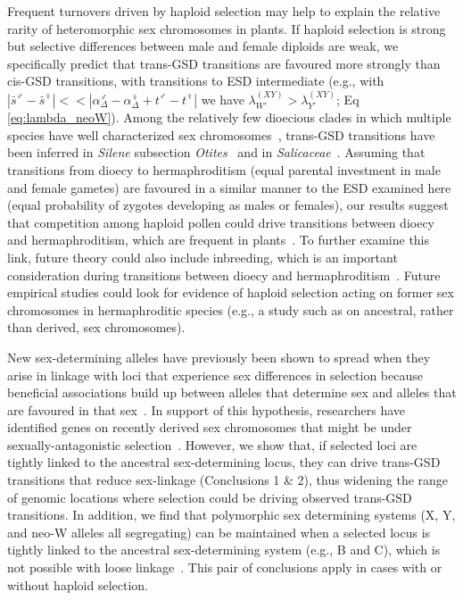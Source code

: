 \documentclass[10pt,letterpaper]{article}
\begin{document}
Frequent turnovers driven by haploid selection may help to explain the relative rarity of heteromorphic sex chromosomes in plants.
If haploid selection is strong but selective differences between male and female diploids are weak, we specifically predict that trans-GSD transitions are favoured more strongly than cis-GSD transitions, with transitions to ESD intermediate (e.g., with $|\bar{s}^\male - \bar{s}^\female| << |\alpha_\Delta^\male - \alpha_\Delta^\female + t^\male - t^\female|$ we have $\lambda_{W'}^{(XY)} > \lambda_{Y'}^{(XY)}$; Eq \ref{eq:lambda_neoW}). 
Among the relatively few dioecious clades in which multiple species have well characterized sex chromosomes~\cite{Ming:2011iy}, trans-GSD transitions have been inferred in \textit{Silene} subsection \textit{Otites}~\cite{Slancarova:2013dq} and in \textit{Salicaceae}~\cite{Pucholt2015,Pucholt2017}.
Assuming that transitions from dioecy to hermaphroditism (equal parental investment in male and female gametes) are favoured in a similar manner to the ESD examined here (equal probability of zygotes developing as males or females), our results suggest that competition among haploid pollen could drive transitions between dioecy and hermaphroditism, which are frequent in plants~\cite{Kafer2017, Goldberg2017}. 
To further examine this link, future theory could also include inbreeding, which is an important consideration during transitions between dioecy and hermaphroditism~\cite{Charlesworth1978}. 
Future empirical studies could look for evidence of haploid selection acting on former sex chromosomes in hermaphroditic species (e.g., a study such as \cite{Sandler264382} on ancestral, rather than derived, sex chromosomes). 

New sex-determining alleles have previously been shown to spread when they arise in linkage with loci that experience sex differences in selection because beneficial associations build up between alleles that determine sex and alleles that are favoured in that sex~\cite{vanDoorn:2007eu,vanDoorn:2010hu,Ubeda:2015fx,Muralidhar2018}. 
In support of this hypothesis, researchers have identified genes on recently derived sex chromosomes that might be under sexually-antagonistic selection~\cite{Lindholm:2002dw,Tripathi:2009cw,Roberts2009,Ser:2010iq}. 
However, we show that, if selected loci are tightly linked to the ancestral sex-determining locus, they can drive trans-GSD transitions that reduce sex-linkage (Conclusions 1 \& 2), thus widening the range of genomic locations where selection could be driving observed trans-GSD transitions.
In addition, we find that polymorphic sex determining systems (X, Y, and neo-W alleles all segregating) can be maintained when a selected locus is tightly linked to the ancestral sex-determining system (e.g., B and C), which is not possible with loose linkage~\cite{vanDoorn:2010hu}. 
This pair of conclusions apply in cases with or without haploid selection. 
\end{document}
